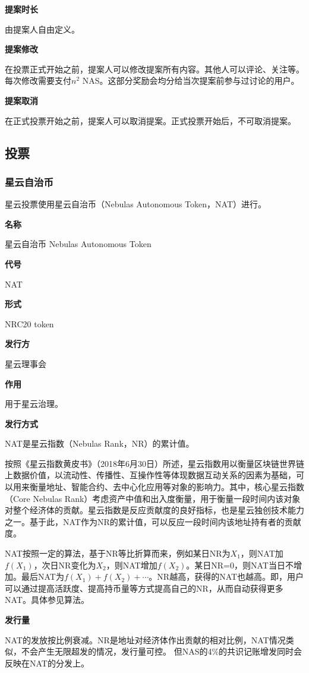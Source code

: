 \textbf{提案时长}

由提案人自由定义。

\textbf{提案修改}

在投票正式开始之前，提案人可以修改提案所有内容。其他人可以评论、关注等。每次修改需要支付$n^2$ NAS。这部分奖励会均分给当次提案前参与过讨论的用户。

\textbf{提案取消}

在正式投票开始之前，提案人可以取消提案。正式投票开始后，不可取消提案。

\subsection{投票}
\subsubsection{星云自治币}
星云投票使用星云自治币（Nebulas Autonomous Token，NAT）进行。

\textbf{名称}

星云自治币 Nebulas Autonomous Token

\textbf{代号}

NAT

\textbf{形式}

NRC20 token

\textbf{发行方}

星云理事会

\textbf{作用}

用于星云治理。

\textbf{发行方式}

NAT是星云指数（Nebulas Rank，NR）的累计值。

按照《星云指数黄皮书》（2018年6月30日）所述，星云指数用以衡量区块链世界链上数据价值，以流动性、传播性、互操作性等体现数据互动关系的因素为基础，可以用来衡量地址、智能合约、去中心化应用等对象的影响力。其中，核心星云指数（Core Nebulas Rank）考虑资产中值和出入度衡量，用于衡量一段时间内该对象对整个经济体的贡献。星云指数是反应贡献度的良好指标，也是星云独创技术能力之一。基于此，NAT作为NR的累计值，可以反应一段时间内该地址持有者的贡献度。

NAT按照一定的算法，基于NR等比折算而来，例如某日NR为$X_1$，则NAT加$f(X_1)$，次日NR变化为$X_2$，则NAT增加$f(X_2)$。某日NR=0，则NAT当日不增加。最后NAT为$f(X_1)+f(X_2)+\cdots$。NR越高，获得的NAT也越高。即，用户可以通过提高活跃度、提高持币量等方式提高自己的NR，从而自动获得更多NAT。具体参见算法。

\textbf{发行量}
	
NAT的发放按比例衰减。NR是地址对经济体作出贡献的相对比例，NAT情况类似，不会产生无限超发的情况，发行量可控。
但NAS的4\%的共识记账增发同时会反映在NAT的分发上。

